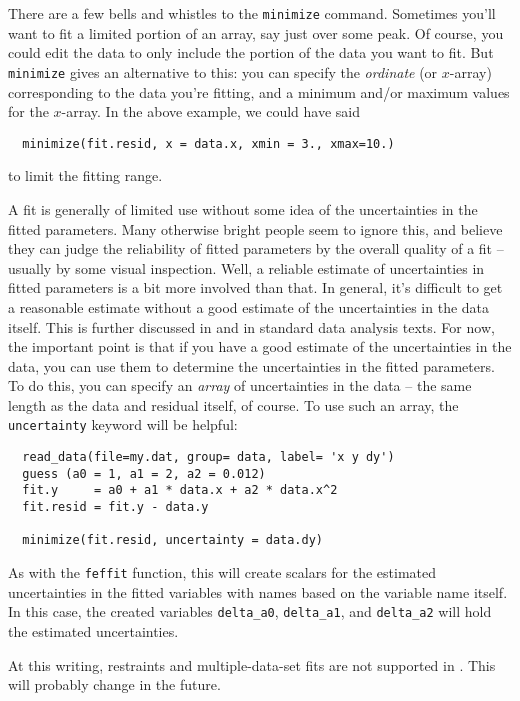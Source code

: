 There are a few bells and whistles to the {\tt{minimize}} command.
Sometimes you'll want to fit a limited portion of an array, say just over
some peak.  Of course, you could edit the data to only include the portion
of the data you want to fit.  But {\tt{minimize}} gives an alternative to
this: you can specify the {\emph{ordinate}} (or $x$-array) corresponding to
the data you're fitting, and a minimum and/or maximum values for the
$x$-array.  In the above example, we could have said

\begin{verbatim}
  minimize(fit.resid, x = data.x, xmin = 3., xmax=10.)
\end{verbatim}
\noindent
to limit the fitting range.

A fit is generally of limited use without some idea of the uncertainties in
the fitted parameters.  Many otherwise bright people seem to ignore this,
and believe they can judge the reliability of fitted parameters by the
overall quality of a fit --usually by some visual inspection.  Well, a
reliable estimate of uncertainties in fitted parameters is a bit more
involved than that.  In general, it's difficult to get a reasonable
estimate without a good estimate of the uncertainties in the data itself.
This is further discussed in {\XAIBook} and in standard data analysis
texts.  For now, the important point is that if you have a good estimate of
the uncertainties in the data, you can use them to determine the
uncertainties in the fitted parameters.  To do this, you can specify an
{\emph{array}} of uncertainties in the data -- the same length as the data
and residual itself, of course.  To use such an array, the
{\tt{uncertainty}} keyword will be helpful:
\begin{verbatim}
  read_data(file=my.dat, group= data, label= 'x y dy')
  guess (a0 = 1, a1 = 2, a2 = 0.012)
  fit.y     = a0 + a1 * data.x + a2 * data.x^2
  fit.resid = fit.y - data.y

  minimize(fit.resid, uncertainty = data.dy)
\end{verbatim}
\noindent
As with the {\tt{feffit}} function, this will create scalars for the
estimated uncertainties in the fitted variables with names based on the
variable name itself.  In this case, the created variables
{\tt{delta\_a0}}, {\tt{delta\_a1}}, and {\tt{delta\_a2}} will hold the
estimated uncertainties.

At this writing, restraints and multiple-data-set fits are not supported in
{}.   This will probably change in the future.

